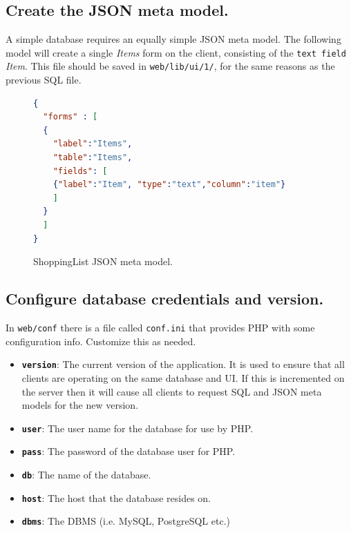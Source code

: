 \documentclass[journal]{IEEEtran}
\begin{document}
\subsection{Create the JSON meta model.}  \label{sec:}

A simple database requires an equally simple JSON meta model. The following model will create a single \textit{Items} form on the client, consisting of the \texttt{text field} \textit{Item}. This file should be saved in \texttt{web/lib/ui/1/}, for the same reasons as the previous SQL file.

\begin{figure}[h!]
\begin{lstlisting}[language=json]
{
  "forms" : [
  { 
    "label":"Items",
    "table":"Items",
    "fields": [
    {"label":"Item", "type":"text","column":"item"}
    ]
  }
  ]
}
\end{lstlisting}
\caption{ShoppingList JSON meta model.}
\label{fig:shoppinglist_json}
\end{figure}


\subsection{Configure database credentials and version.}  \label{sec:}

In \texttt{web/conf} there is a file called \texttt{conf.ini} that provides PHP with some configuration info. Customize this as needed.

\begin{itemize}
\item \texttt{\textbf{version}}: The current version of the application. It is used to ensure that all clients are operating on the same database and UI. If this is incremented on the server then it will cause all clients to request SQL and JSON meta models for the new version.
\item \texttt{\textbf{user}}: The user name for the database for use by PHP.
\item \texttt{\textbf{pass}}: The password of the database user for PHP.
\item \texttt{\textbf{db}}: The name of the database. 
\item \texttt{\textbf{host}}: The host that the database resides on.
\item \texttt{\textbf{dbms}}: The DBMS (i.e. MySQL, PostgreSQL etc.)
\end{itemize}
\end{document}
